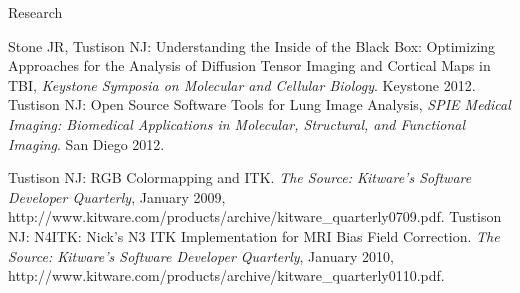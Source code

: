 \documentclass{resume}
\def\-{\discretionary{}{}{}}
\begin{document}
\begin{category}{Research}

   \begin{itemize}
   \citemnobullet Stone JR, Tustison NJ:  Understanding the Inside of the Black Box: 
   Optimizing Approaches for the Analysis of Diffusion Tensor Imaging and Cortical Maps in TBI,
   {\em Keystone Symposia on Molecular and Cellular Biology}.  Keystone 2012.
   \citemnobullet Tustison NJ:  Open Source Software Tools for Lung Image Analysis, 
   {\em SPIE Medical Imaging: Biomedical Applications in Molecular, Structural, and 
   Functional Imaging}. San Diego 2012. 
   \end{itemize}


   \begin{itemize}
   \citemnobullet Tustison NJ: RGB Colormapping and ITK.  {\em The Source:  Kitware's Software Developer Quarterly}, January 2009, http://\-www\-.\-kitware\-.\-com/\-products/\-archive/\-kitware\_\-quarterly\-0709\-.pdf.
   \citemnobullet Tustison NJ: N4ITK:  Nick's N3 ITK Implementation for MRI Bias Field Correction.  {\em The Source:  Kitware's Software Developer Quarterly}, January 2010, http://\-www\-.\-kitware\-.\-com/\-products/\-archive/\-kitware\_\-quarterly\-0110\-.pdf.
   \end{itemize}



\end{category}
\end{document}

